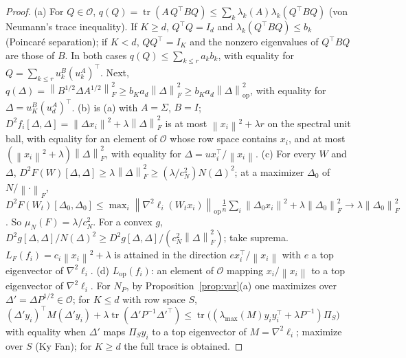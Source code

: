 \documentclass[11pt]{article}
\theoremstyle{definition}
\theoremstyle{remark}
\newcommand{\norm}[1]{\left\|#1\right\|}
\newcommand{\nop}[1]{\left\|#1\right\|_{\mathrm{op}}}
\newcommand{\nF}[1]{\left\|#1\right\|_{F}}
\newcommand{\tr}{\operatorname{tr}}
\newcommand{\Lop}{L_{\mathrm{op}}}
\newcommand{\cO}{\mathcal{O}}
\newcommand{\lmax}{\lambda_{\max}}
\begin{document}
\begin{proof}
(a) For $Q\in\cO$, $q(Q)=\tr(A\,Q^\top BQ)\le\sum_k\lambda_k(A)\lambda_k(Q^\top BQ)$ (von Neumann's trace inequality).
If $K\ge d$, $Q^\top Q=I_d$ and $\lambda_k(Q^\top BQ)\le b_k$ (Poincar\'e separation); if $K<d$, $QQ^\top=I_K$ and the
nonzero eigenvalues of $Q^\top BQ$ are those of $B$. In both cases $q(Q)\le\sum_{k\le r}a_kb_k$, with equality for
$Q=\sum_{k\le r}u^B_k(u^A_k)^\top$. Next, $q(\Delta)=\nF{B^{1/2}\Delta A^{1/2}}^2\ge b_Ka_d\nF\Delta^2\ge b_Ka_d\nop\Delta^2$,
with equality for $\Delta=u^B_K(u^A_d)^\top$.
(b) is (a) with $A=\Sigma$, $B=I$; $D^2f_i[\Delta,\Delta]=\norm{\Delta x_i}^2+\lambda\nF\Delta^2$ is at most
$\norm{x_i}^2+\lambda r$ on the spectral unit ball, with equality for an element of $\cO$ whose row space contains $x_i$,
and at most $(\norm{x_i}^2+\lambda)\nF\Delta^2$, with equality for $\Delta=ux_i^\top/\norm{x_i}$.
(c) For every $W$ and $\Delta$, $D^2F(W)[\Delta,\Delta]\ge\lambda\nF\Delta^2\ge(\lambda/c_N^2)N(\Delta)^2$; at a maximizer
$\Delta_0$ of $N/\nF\cdot$, $D^2F(W_t)[\Delta_0,\Delta_0]\le\max_i\nop{\nabla^2\ell_i(W_tx_i)}\frac1n\sum_i\norm{\Delta_0x_i}^2
+\lambda\nF{\Delta_0}^2\to\lambda\nF{\Delta_0}^2$. So $\mu_N(F)=\lambda/c_N^2$. For a convex $g$,
$D^2g[\Delta,\Delta]/N(\Delta)^2\ge D^2g[\Delta,\Delta]/(c_N^2\nF\Delta^2)$; take suprema. $L_F(f_i)=c_i\norm{x_i}^2+\lambda$
is attained in the direction $ex_i^\top/\norm{x_i}$ with $e$ a top eigenvector of $\nabla^2\ell_i$.
(d) $\Lop(f_i)$: an element of $\cO$ mapping $x_i/\norm{x_i}$ to a top eigenvector of $\nabla^2\ell_i$. For $N_P$, by
Proposition~\ref{prop:var}(a) one maximizes over $\Delta'=\Delta P^{1/2}\in\cO$; for $K\le d$ with row space $S$,
$(\Delta'y_i)^\top M(\Delta'y_i)+\lambda\tr(\Delta'P^{-1}\Delta'^\top)\le\tr\big((\lmax(M)y_iy_i^\top+\lambda P^{-1})\Pi_S\big)$
with equality when $\Delta'$ maps $\Pi_Sy_i$ to a top eigenvector of $M=\nabla^2\ell_i$; maximize over $S$ (Ky Fan); for
$K\ge d$ the full trace is obtained.
\end{proof}
\end{document}
